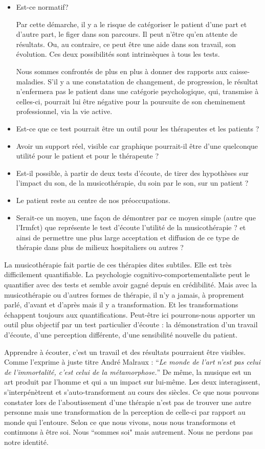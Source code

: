 \begin{itemize}
\item Est-ce normatif? 

Par cette démarche, il y a le risque de catégoriser le patient d'une part 
 et d'autre part, le figer dans son parcours. Il peut n'être qu'en attente de résultats. Ou, au contraire, ce peut être une aide 
dans son travail, son évolution. Ces deux possibilités sont
intrinsèques à tous les tests.

Nous sommes confrontés de plus en plus à donner des rapports aux caisse-maladies.
S'il y a une constatation de changement, de progression, le résultat
n'enfermera pas le patient dans une catégorie psychologique, qui,
transmise à celles-ci, pourrait lui être négative pour la poursuite
de son cheminement professionnel, via la vie active. 
\item Est-ce que ce test pourrait être un outil pour les thérapeutes et
les patients ? 
\item Avoir un support réel, visible car graphique pourrait-il être d'une
quelconque utilité pour le patient et pour le thérapeute ?
\item Est-il possible, à partir de deux tests d'écoute, de tirer des hypothèses
sur l'impact du son, de la musicothérapie, du soin par le son, sur
un patient ?
\item Le patient reste au centre de nos préoccupations.
\item Serait-ce un moyen, une façon de démontrer par ce moyen simple (autre
que l'Irmfct) que représente le test d'écoute l'utilité de la musicothérapie
? et ainsi de permettre une plus large acceptation et diffusion de
ce type de thérapie dans plus de milieux hospitaliers ou autres ?


\end{itemize}

La musicothérapie fait partie de ces thérapies dites subtiles. Elle
est très difficilement quantifiable. La
psychologie cognitivo-comportementaliste peut le quantifier avec des tests et semble avoir gagné depuis en crédibilité. Mais avec la musicothérapie ou d'autres formes de thérapie, il n'y a
jamais, à proprement parlé, d'avant et d'après mais il y a transformation.
Et les transformations échappent toujours aux quantifications. Peut-être
ici pourrons-nous apporter un outil plus objectif par un test particulier
d'écoute : la démonstration d'un travail d'écoute, d'une perception
différente, d'une sensibilité nouvelle du patient. 


Apprendre à écouter,
c'est un travail et des résultats pourraient être visibles.
Comme l'exprime à juste titre André Malraux : \enquote{\emph{Le monde de
	l'art n'est pas celui de l'immortalité, c'est celui de la métamorphose.}}
De même, la musique est un art produit par l'homme et qui a un impact
sur lui-même. Les deux interagissent, s'interpénètrent et s'auto-transforment
au cours des siècles.
 Ce que nous pouvons constater lors de l'aboutissement
d'une thérapie n'est pas de trouver une autre personne mais une transformation
de la perception de celle-ci par rapport au monde qui l'entoure. 
Selon
ce que nous vivons, nous nous transformons et continuons à être
soi. Nous ``sommes soi" mais autrement. Nous ne perdons
pas notre identité.

